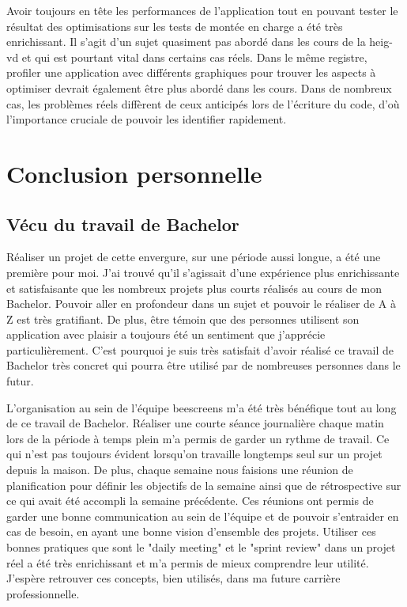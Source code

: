 Avoir toujours en tête les performances de l'application tout en pouvant tester le résultat des optimisations sur les tests de montée en charge a été très enrichissant. Il s'agit d'un sujet quasiment pas abordé dans les cours de la \gls{heig-vd} et qui est pourtant vital dans certains cas réels. Dans le même registre, profiler une application avec différents graphiques pour trouver les aspects à optimiser devrait également être plus abordé dans les cours. Dans de nombreux cas, les problèmes réels diffèrent de ceux anticipés lors de l'écriture du code, d'où l'importance cruciale de pouvoir les identifier rapidement.

\section{Conclusion personnelle}

\subsection{Vécu du travail de Bachelor}

Réaliser un projet de cette envergure, sur une période aussi longue, a été une première pour moi. J'ai trouvé qu'il s'agissait d'une expérience plus enrichissante et satisfaisante que les nombreux projets plus courts réalisés au cours de mon Bachelor. Pouvoir aller en profondeur dans un sujet et pouvoir le réaliser de A à Z est très gratifiant. De plus, être témoin que des personnes utilisent son application avec plaisir a toujours été un sentiment que j'apprécie particulièrement. C'est pourquoi je suis très satisfait d'avoir réalisé ce travail de Bachelor très concret qui pourra être utilisé par de nombreuses personnes dans le futur.

L'organisation au sein de l'équipe \gls{beescreens} m'a été très bénéfique tout au long de ce travail de Bachelor. Réaliser une courte séance journalière chaque matin lors de la période à temps plein m'a permis de garder un rythme de travail. Ce qui n'est pas toujours évident lorsqu'on travaille longtemps seul sur un projet depuis la maison. De plus, chaque semaine nous faisions une réunion de planification pour définir les objectifs de la semaine ainsi que de rétrospective sur ce qui avait été accompli la semaine précédente. Ces réunions ont permis de garder une bonne communication au sein de l'équipe et de pouvoir s'entraider en cas de besoin, en ayant une bonne vision d'ensemble des projets. Utiliser ces bonnes pratiques que sont le "daily meeting" et le "sprint review" dans un projet réel a été très enrichissant et m'a permis de mieux comprendre leur utilité. J'espère retrouver ces concepts, bien utilisés, dans ma future carrière professionnelle.

